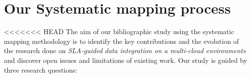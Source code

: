 \section{Our Systematic mapping process}\label{sec:sm}


 




<<<<<<< HEAD
The aim of our bibliographic study using the systematic mapping methodology \cite{SM:Petersen:2008}  is to identify   the key contributions and the evolution of the research done on \textit{SLA-guided
data integration on a multi-cloud environments} and discover open issues and limitations of existing work.    
Our study is guided by  three research questions:

